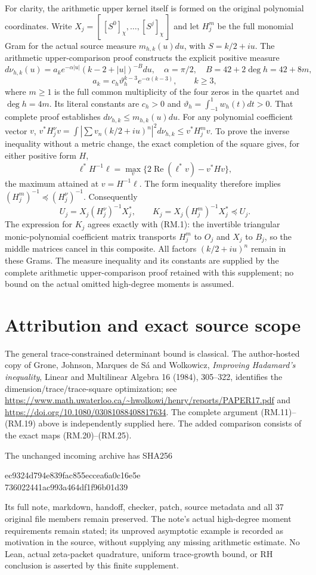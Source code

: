 \documentclass[11pt]{article}
\begin{document}
For clarity, the arithmetic upper kernel itself is formed on the original
polynomial coordinates. Write $X_j=[\,[S^0]_\chi,\ldots,[S^j]_\chi\,]$
and let $H_j^m$ be the full monomial Gram for the actual source measure
$m_{h,k}(u)du$, with $S=k/2+iu$. The arithmetic upper-comparison proof
constructs the explicit positive measure
\[
 d\nu_{h,k}(u)=a_k e^{-\alpha|u|}(k-2+|u|)^{-B}du,
 \quad \alpha=\pi/2,\quad B=42+2\deg h=42+8m,
\]
\[
 a_k=c_h\vartheta_h^{k-3}e^{-\alpha(k-3)},\qquad k\ge3,
\]
where $m\ge1$ is the full common multiplicity of the four zeros in the
quartet and $\deg h=4m$. Its literal constants are $c_h>0$ and
$\vartheta_h=\int_{-1}^1w_h(t)dt>0$. That complete proof establishes
$d\nu_{h,k}\le m_{h,k}(u)du$.
For any polynomial coefficient vector $v$,
$v^*H_j^\nu v=\int|\sum v_n(k/2+iu)^n|^2d\nu_{h,k}
\le v^*H_j^m v$. To prove the inverse inequality without a metric change,
the exact completion of the square gives, for either positive form $H$,
\[
 \ell^*H^{-1}\ell=\max_v\{2\operatorname{Re}(\ell^*v)-v^*Hv\},
\]
the maximum attained at $v=H^{-1}\ell$. The form inequality therefore
implies $(H_j^m)^{-1}\preceq(H_j^\nu)^{-1}$. Consequently
\begin{equation}
 U_j=X_j(H_j^\nu)^{-1}X_j^*,\qquad
 K_j=X_j(H_j^m)^{-1}X_j^*\preceq U_j.\tag{RM.35}
\end{equation}
The expression for $K_j$ agrees exactly with (RM.1): the invertible
triangular monic-polynomial coefficient matrix transports $H_j^m$ to
$O_j$ and $X_j$ to $B_j$, so the middle matrices cancel in this composite.
All factors $(k/2+iu)^n$ remain in these Grams. The measure inequality and
its constants are supplied by the complete arithmetic upper-comparison
proof retained with this supplement; no bound on the actual omitted
high-degree moments is assumed.

\section{Attribution and exact source scope}
The general trace-constrained determinant bound is classical. The author-hosted
copy of Grone, Johnson, Marques de S\'a and Wolkowicz,
\emph{Improving Hadamard's inequality}, Linear and Multilinear Algebra
16 (1984), 305--322, identifies the dimension/trace/trace-square optimization;
see \url{https://www.math.uwaterloo.ca/~hwolkowi/henry/reports/PAPER17.pdf}
and \url{https://doi.org/10.1080/03081088408817634}.
The complete argument (RM.11)--(RM.19) above is independently supplied here.
The added comparison consists of the exact maps (RM.20)--(RM.25).

The unchanged incoming archive has SHA256
\begin{center}\small\ttfamily
ec9324d794e839fac855eccea6a0c16e5e\\
736022441ac993a464df1f96b01d39
\end{center}
Its full note, markdown, handoff, checker, patch, source metadata and all
37 original file members remain preserved. The note's actual high-degree
moment requirements remain stated; its unproved asymptotic example is recorded
as motivation in the source, without supplying any missing arithmetic estimate.
No Lean, actual zeta-packet quadrature, uniform trace-growth bound, or RH
conclusion is asserted by this finite supplement.
\end{document}
